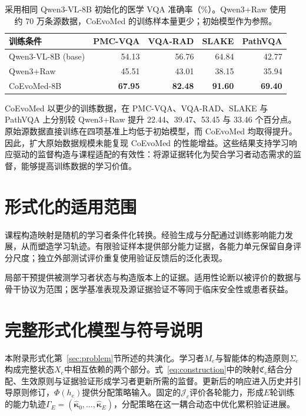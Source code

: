 \begin{table}[!htbp]
\centering\small
\caption{采用相同 Qwen3-VL-8B 初始化的医学 VQA 准确率（\%）。Qwen3+Raw 使用约 70 万条源数据，CoEvoMed 的训练样本量更少；初始模型作为参照。}
\label{tab:raw_source}
\setlength{\tabcolsep}{7pt}
\begin{tabular}{@{}lrrrr@{}}
\toprule
训练条件 & PMC-VQA & VQA-RAD & SLAKE & PathVQA\\
\midrule
Qwen3-VL-8B (base) & 54.13 & 56.76 & 64.84 & 42.77\\
Qwen3+Raw & 45.51 & 43.01 & 38.15 & 35.94\\
\rowcolor{mainOurs} CoEvoMed-8B & \textbf{67.95} & \textbf{82.48} & \textbf{91.60} & \textbf{69.40}\\
\bottomrule
\end{tabular}
\end{table}

CoEvoMed 以更少的训练数据，在 PMC-VQA、VQA-RAD、SLAKE 与 PathVQA 上分别较 Qwen3+Raw 提升 22.44、39.47、53.45 与 33.46 个百分点。原始源数据直接训练在四项基准上均低于初始模型，而 CoEvoMed 均取得提升。因此，扩大原始数据规模未能复现 CoEvoMed 的性能增益。这些结果支持学习响应驱动的监督构造与课程适配的有效性：将源证据转化为契合学习者动态需求的监督，能够提高训练数据的学习价值。

\section{形式化的适用范围}
\label{sec:limitations}

课程构造映射是随机的学习者条件化转换。经验生成与分配通过训练影响能力发展，从而塑造学习轨迹。有限验证样本提供部分能力证据，各能力单元保留自身评分尺度；独立外部测试评价重复使用验证反馈后的泛化表现。

局部干预提供被测学习者状态与构造版本上的证据。适用性论断以被评价的数据与骨干协议为范围；医学基准表现及源证据验证不等同于临床安全性或患者获益。

\section{完整形式化模型与符号说明}
\label{app:formalization}

本附录形式化第~\ref{sec:problem}节所述的共演化。学习者$M_e$与智能体的构造原则$\Sigma_e$构成完整状态$X_e$中相互依赖的两个部分。式~\ref{eq:construction}中的映射$\mathfrak C_e$结合分配、生效原则与证据验证形成学习者更新所需的监督。更新后的响应进入历史并引导原则修订，$\Phi(h_e)$提供分配策略输入。固定的$\mathcal J_c$评价各轮能力，形成$E$轮训练的能力轨迹$\Gamma_E=(\widehat{\boldsymbol\kappa}_0,\ldots,\widehat{\boldsymbol\kappa}_E)$，分配策略在这一耦合动态中优化累积验证进展。

